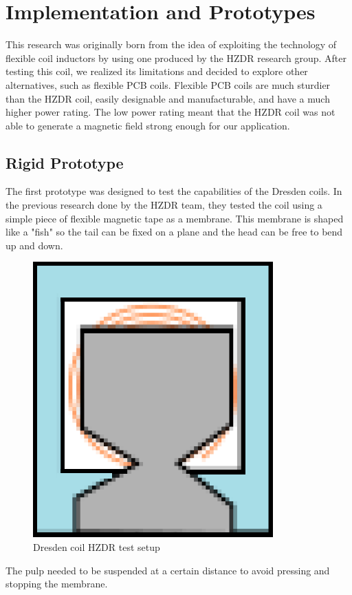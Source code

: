 \section{Implementation and Prototypes}
This research was originally born from the idea of exploiting the technology of flexible coil inductors by using one produced by the HZDR research group.
After testing this coil, we realized its limitations and decided to explore other alternatives, such as flexible PCB coils.
Flexible PCB coils are much sturdier than the HZDR coil, easily designable and manufacturable, and have a much higher power rating.
The low power rating meant that the HZDR coil was not able to generate a magnetic field strong enough for our application.

\subsection{Rigid Prototype}
The first prototype was designed to test the capabilities of the Dresden coils.
In the previous research done by the HZDR team, they tested the coil using a simple piece of flexible magnetic tape as a membrane.
This membrane is shaped like a "fish" so the tail can be fixed on a plane and the head can be free to bend up and down.
\begin{figure}[H]
    \centering
    \includegraphics[width = 0.2\linewidth]{Figures/Dresden_test.png}
    \caption{Dresden coil HZDR test setup}
    \label{fig: Dresden_test}
\end{figure}
The pulp needed to be suspended at a certain distance to avoid pressing and stopping the membrane.

